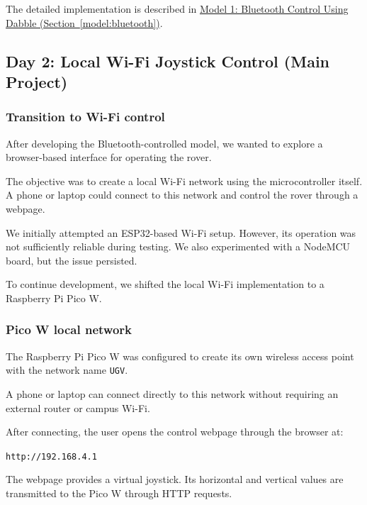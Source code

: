 \documentclass[11pt,a4paper]{article}
\begin{document}
The detailed implementation is described in
\hyperref[model:bluetooth]{Model 1: Bluetooth Control
Using Dabble (Section~\ref*{model:bluetooth})}.



\subsection{Day 2: Local Wi-Fi Joystick Control (Main Project)}

\subsubsection{Transition to Wi-Fi control}

After developing the Bluetooth-controlled model, we
wanted to explore a browser-based interface for
operating the rover.

The objective was to create a local Wi-Fi network
using the microcontroller itself. A phone or laptop
could connect to this network and control the rover
through a webpage.

We initially attempted an ESP32-based Wi-Fi setup.
However, its operation was not sufficiently reliable
during testing. We also experimented with a NodeMCU
board, but the issue persisted.

To continue development, we shifted the local Wi-Fi
implementation to a Raspberry Pi Pico W.


\subsubsection{Pico W local network}

The Raspberry Pi Pico W was configured to create its
own wireless access point with the network name
\texttt{UGV}.

A phone or laptop can connect directly to this network
without requiring an external router or campus Wi-Fi.

After connecting, the user opens the control webpage
through the browser at:

\begin{center}
    \texttt{http://192.168.4.1}
\end{center}

The webpage provides a virtual joystick. Its horizontal
and vertical values are transmitted to the Pico W
through HTTP requests.
\end{document}
